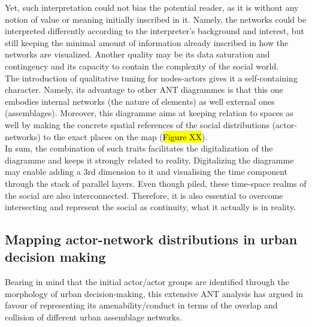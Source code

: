 \documentclass[11pt]{report}
\begin{document}
Yet, such interpretation could not bias the potential reader, as it is without any notion of value or meaning initially inscribed in it.
Namely, the networks could be interpreted differently according to the interpreter's background and interest, but still keeping the minimal amount of information already inscribed in how the networks are visualized.
Another quality may be its data saturation and contingency and its capacity to contain the complexity of the social world.
\\

The introduction of qualitative tuning for nodes-actors gives it a self-containing character.
Namely, its advantage to other ANT diagrammes is that this one embodies internal  networks (the nature of elements) as well external ones (assemblages).
Moreover, this diagramme aims at keeping relation to spaces as well by making the concrete spatial references of the social distributions (actor-networks) to the exact places on the map (\hl{Figure XX}).
\\

In sum, the combination of such traits facilitates the digitalization of the diagramme and keeps it strongly related to reality.
Digitalizing the diagramme  may enable adding a 3rd dimension to it and visualising the time component through the stack of parallel layers. Even though piled, these time-space realms of the social are also interconnected.
Therefore, it is also essential to overcome intersecting and represent the social as continuity, what it actually is in reality. 
  
\subsection{Mapping actor-network distributions in urban decision making}

Bearing in mind that the initial actor/actor groups are identified through the morphology of urban decision-making, this extensive ANT analysis has argued in favour of representing its amenability/conduct in terms of the overlap and collision of different urban assemblage networks.
\\
\end{document}
